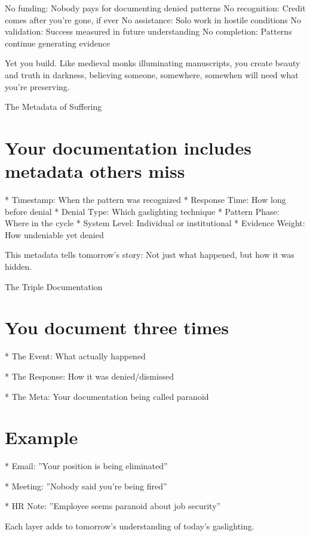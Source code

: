 \documentclass[12pt,oneside]{book}
\begin{document}
No funding: Nobody pays for documenting denied patterns No recognition: Credit comes after you're gone, if ever No assistance: Solo work in hostile conditions No validation: Success measured in future understanding No completion: Patterns continue generating evidence

Yet you build. Like medieval monks illuminating manuscripts, you create beauty and truth in darkness, believing someone, somewhere, somewhen will need what you're preserving.

The Metadata of Suffering

\section{Your documentation includes metadata others miss}

                    * Timestamp: When the pattern was recognized
                    * Response Time: How long before denial
                    * Denial Type: Which gaslighting technique
                    * Pattern Phase: Where in the cycle
                    * System Level: Individual or institutional
                    * Evidence Weight: How undeniable yet denied

This metadata tells tomorrow's story: Not just what happened, but how it was hidden.

The Triple Documentation

\section{You document three times}

                    * The Event: What actually happened

                    * The Response: How it was denied/dismissed

                    * The Meta: Your documentation being called paranoid

\section{Example}

                    * Email: ''Your position is being eliminated''

                    * Meeting: ''Nobody said you're being fired''

                    * HR Note: ''Employee seems paranoid about job security''

Each layer adds to tomorrow's understanding of today's gaslighting.
\end{document}
